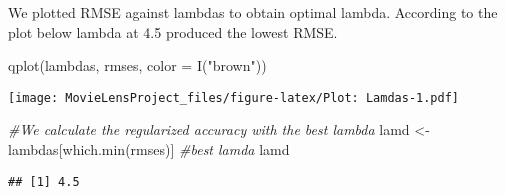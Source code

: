 \documentclass[
]{article}
\newenvironment{Shaded}{\begin{snugshade}}{\end{snugshade}}
\newcommand{\AttributeTok}[1]{\textcolor[rgb]{0.77,0.63,0.00}{#1}}
\newcommand{\CommentTok}[1]{\textcolor[rgb]{0.56,0.35,0.01}{\textit{#1}}}
\newcommand{\FunctionTok}[1]{\textcolor[rgb]{0.00,0.00,0.00}{#1}}
\newcommand{\NormalTok}[1]{#1}
\newcommand{\OtherTok}[1]{\textcolor[rgb]{0.56,0.35,0.01}{#1}}
\newcommand{\StringTok}[1]{\textcolor[rgb]{0.31,0.60,0.02}{#1}}
\begin{document}
We plotted RMSE against lambdas to obtain optimal lambda. According to
the plot below lambda at 4.5 produced the lowest RMSE.

\begin{Shaded}
\begin{Highlighting}[]
  \FunctionTok{qplot}\NormalTok{(lambdas, rmses, }\AttributeTok{color =} \FunctionTok{I}\NormalTok{(}\StringTok{"brown"}\NormalTok{)) }
\end{Highlighting}
\end{Shaded}

\texttt{[image: MovieLensProject\_files/figure-latex/Plot: Lamdas-1.pdf]}

\begin{Shaded}
\begin{Highlighting}[]
  \CommentTok{\#We calculate the regularized accuracy with the best lambda}
\NormalTok{  lamd }\OtherTok{\textless{}{-}}\NormalTok{ lambdas[}\FunctionTok{which.min}\NormalTok{(rmses)] }\CommentTok{\#best lamda}
\NormalTok{  lamd}
\end{Highlighting}
\end{Shaded}

\begin{verbatim}
## [1] 4.5
\end{verbatim}
\end{document}
